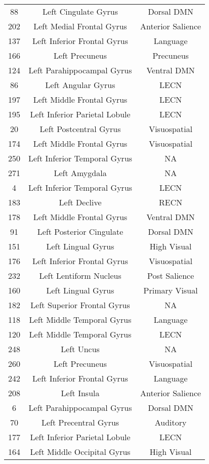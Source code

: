 \documentclass[10pt,letterpaper]{article}\usepackage[]{graphicx}\usepackage[]{color}
\begin{document}
\begin{center}
\begin{longtable}[c]{ccc}
		88 & Left Cingulate Gyrus & Dorsal DMN \\
		202	& Left Medial Frontal Gyrus & Anterior Salience \\
		137	& Left Inferior Frontal Gyrus & Language \\
		166	& Left Precuneus & Precuneus \\
		124	& Left Parahippocampal Gyrus & Ventral DMN \\
		86	& Left Angular Gyrus & LECN \\
		197	& Left Middle Frontal Gyrus	& LECN \\
		195	& Left Inferior Parietal Lobule	& LECN \\
		20 & Left Postcentral Gyrus	& Visuospatial \\
		174	& Left Middle Frontal Gyrus	& Visuospatial \\
		250	& Left Inferior Temporal Gyrus & NA \\
		271	& Left Amygdala & NA \\
		4 & Left Inferior Temporal Gyrus & LECN \\
		183	& Left Declive & RECN \\
		178	& Left Middle Frontal Gyrus	& Ventral DMN \\
		91 & Left Posterior Cingulate & Dorsal DMN \\
		151	& Left Lingual Gyrus & High Visual \\
		176	& Left Inferior Frontal Gyrus & Visuospatial \\
		232	& Left Lentiform Nucleus & Post Salience \\
		160	& Left Lingual Gyrus & Primary Visual \\
		182	& Left Superior Frontal Gyrus & NA \\
		118	& Left Middle Temporal Gyrus & Language \\
		120	& Left Middle Temporal Gyrus & LECN \\
		248	& Left Uncus & NA \\
		260	& Left Precuneus & Visuospatial \\
		242	& Left Inferior Frontal Gyrus & Language \\
		208	& Left Insula & Anterior Salience \\
		6 & Left Parahippocampal Gyrus & Dorsal DMN \\
		70 & Left Precentral Gyrus & Auditory \\
		177	& Left Inferior Parietal Lobule	& LECN \\
		164	& Left Middle Occipital Gyrus & High Visual \\

\end{longtable}
\end{center}
\end{document}
